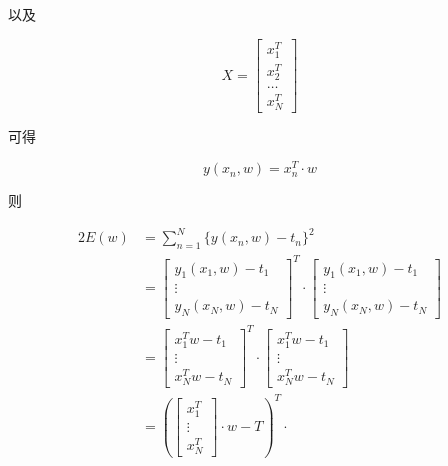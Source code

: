 以及

\begin{equation}
    X =
    \begin{bmatrix}
        x_1^T \\ x_2^T \\ \ldots \\ x_N^T
    \end{bmatrix}
\end{equation}

可得

\begin{equation}
    y(x_n, w) = x_n^T \cdot w
\end{equation}

则

\begin{align}
    2 E(w)  &= \sum_{n=1}^{N} \{ y(x_n, w) - t_n \}^2 \\
            &=  \begin{bmatrix}
                    y_1(x_1, w) - t_1 \\ \vdots \\ y_N(x_N, w) - t_N
                \end{bmatrix}
                ^T
                \cdot 
                \begin{bmatrix}
                    y_1(x_1, w) - t_1 \\ \vdots \\ y_N(x_N, w) - t_N
                \end{bmatrix} \\
            &=  \begin{bmatrix}
                    x_1^T w - t_1 \\ \vdots \\ x_N^T w - t_N
                \end{bmatrix}
                ^T
                \cdot 
                \begin{bmatrix}
                    x_1^T w - t_1 \\ \vdots \\ x_N^T w - t_N
                \end{bmatrix} \\
            &=  \left(
                \begin{bmatrix}
                    x_1^T \\ \vdots \\ x_N^T    
                \end{bmatrix}
                \cdot
                w - T
                \right)^T
                \cdot

\end{align}
